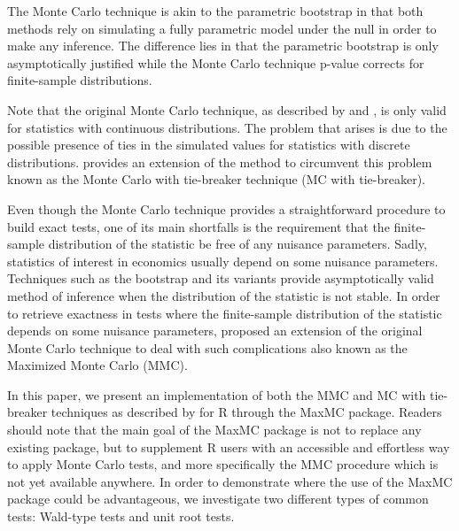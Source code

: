 \documentclass[]{article}\usepackage[]{graphicx}\usepackage[]{color}
\newcommand{\pkg}[1]{{\normalfont\fontseries{b}\selectfont #1}}
\let\proglang=\textsf
\begin{document}
The Monte Carlo technique is akin to the parametric bootstrap in that both methods rely on simulating a fully parametric model under the null in order to make any inference. The difference lies in that the parametric bootstrap is only asymptotically justified while the Monte Carlo technique p-value corrects for finite-sample distributions.

Note that the original Monte Carlo technique, as described by \cite{dwass_modified_1957} and \cite{barnard_comment_1963}, is only valid for statistics with continuous distributions. The problem that arises is due to the possible presence of ties in the simulated values for statistics with discrete distributions. \cite{dufour_monte_2006} provides an extension of the method to circumvent this problem known as the Monte Carlo with tie-breaker technique (MC with tie-breaker).

Even though the Monte Carlo technique provides a straightforward procedure to build exact tests, one of its main shortfalls is the requirement that the finite-sample distribution of the statistic be free of any nuisance parameters. Sadly, statistics of interest in economics usually depend on some nuisance parameters. Techniques such as the bootstrap and its variants provide asymptotically valid method of inference when the distribution of the statistic is not stable. In order to retrieve exactness in tests where the finite-sample distribution of the statistic depends on some nuisance parameters, \cite{dufour_monte_2006} proposed an extension of the original Monte Carlo technique to deal with such complications also known as the Maximized Monte Carlo (MMC).

In this paper, we present an implementation of both the MMC and MC with tie-breaker techniques as described by \cite{dufour_monte_2006} for \proglang{R} through the \pkg{MaxMC} package. Readers should note that the main goal of the \pkg{MaxMC} package is not to replace any existing package, but to supplement \proglang{R} users with an accessible and effortless way to apply Monte Carlo tests, and more specifically the MMC procedure which is not yet available anywhere. In order to demonstrate where the use of the \pkg{MaxMC} package could be advantageous, we investigate two different types of common tests: Wald-type tests and unit root tests.
\end{document}
